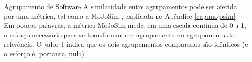\begin{section}{Agrupamento de Software}
A similaridade entre agrupamentos pode ser aferida por uma métrica, tal como a MoJoSim \cite{Tzerpos1999,Bittencourt2009}, explicada no Apêndice \ref{cap:mojosim}. Em poucas palavras, a métrica MoJoSim mede, em uma escala contínua de 0 a 1, o esforço necessário para se transformar um agrupamento no agrupamento de referência. O valor 1 indica que os dois agrupamentos comparados são idênticos (e o esforço é, portanto, nulo).


\end{section}

